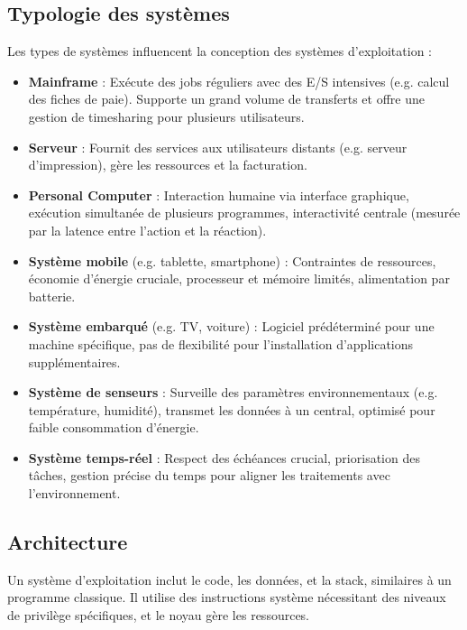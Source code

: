 \subsection{Typologie des systèmes}

Les types de systèmes influencent la conception des systèmes d'exploitation :

\begin{itemize}
    \item \textbf{Mainframe} : Exécute des jobs réguliers avec des E/S intensives (e.g. calcul des fiches de paie). 
    Supporte un grand volume de transferts et offre une gestion de timesharing pour plusieurs utilisateurs.
    \item \textbf{Serveur} : Fournit des services aux utilisateurs distants (e.g. serveur d'impression), gère les ressources et la facturation.
    \item \textbf{Personal Computer} : Interaction humaine via interface graphique, exécution simultanée de plusieurs programmes, interactivité centrale (mesurée par la latence entre l'action et la réaction).
    \item \textbf{Système mobile} (e.g. tablette, smartphone) : Contraintes de ressources, économie d'énergie cruciale, processeur et mémoire limités, alimentation par batterie.
    \item \textbf{Système embarqué} (e.g. TV, voiture) : Logiciel prédéterminé pour une machine spécifique, pas de flexibilité pour l'installation d'applications supplémentaires.
    \item \textbf{Système de senseurs} : Surveille des paramètres environnementaux (e.g. température, humidité), transmet les données à un central, optimisé pour faible consommation d'énergie.
    \item \textbf{Système temps-réel} : Respect des échéances crucial, priorisation des tâches, gestion précise du temps pour aligner les traitements avec l'environnement.
\end{itemize}


\subsection{Architecture}

Un système d'exploitation inclut le code, les données, et la stack, similaires à un programme classique. Il utilise des instructions système nécessitant des niveaux de privilège spécifiques, et le noyau gère les ressources.

